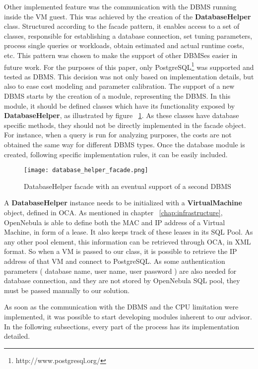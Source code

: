 Other implemented feature was the communication with the DBMS running inside the VM guest. This was achieved by the creation of the \textbf{DatabaseHelper} class. Structured according to the facade pattern, it enables access to a set of classes, responsible for establishing a database connection, set tuning parameters, process single queries or workloads, obtain estimated and actual runtime costs, etc. This pattern was chosen to make the support of other DBMSes easier in future work. For the purposes of this paper, only PostgreSQL\footnote{http://www.postgresql.org/} was supported and tested as DBMS. This decision was not only based on implementation details, but also to ease cost modeling and parameter calibration. The support of a new DBMS starts by the creation of a module, representing the DBMS. In this module,  it should be defined classes which have its functionality exposed by \textbf{DatabaseHelper}, as illustrated by figure ~\ref{fig:facade}. As these classes have database specific methods, 
they should not be 
directly implemented in the facade object. For instance, when a query is run for analyzing purposes, the costs are not obtained the same way for different DBMS types. Once the database module is created, following specific implementation rules, it can be easily included. 

\begin{figure}[ht]
  \centering
 \texttt{[image: database\_helper\_facade.png]}
  \caption{DatabaseHelper facade with an eventual support of a second DBMS}
  \label{fig:facade}
\end{figure}

A \textbf{DatabaseHelper} instance needs to be initialized with a \textbf{VirtualMachine} object, defined in OCA. As mentioned in chapter ~\ref{chap:infrastructure}, OpenNebula is able to define both the MAC and IP address of a Virtual Machine, in form of a lease. It also keeps track of these leases in its SQL Pool. As any other pool element, this information can be retrieved through OCA, in XML format. So when a VM is passed to our class, it is possible to retrieve the IP address of that VM and connect to PostgreSQL. As some authentication parameters ( database name, user name, user password ) are also needed for database connection, and they are not stored by OpenNebula SQL pool, they must be passed manually to our solution.

As soon as the communication with the DBMS and the CPU limitation were implemented, it was possible to start developing modules inherent to our advisor. In the following subsections, every part of the process has its implementation detailed.

